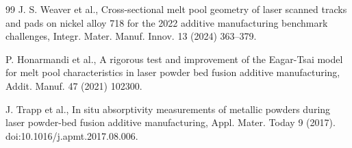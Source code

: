 \documentclass[preprint,times]{elsarticle}
\begin{document}
\begin{thebibliography}{99}
J. S. Weaver et al., Cross-sectional melt pool geometry of laser scanned tracks and pads on nickel
alloy 718 for the 2022 additive manufacturing benchmark challenges, Integr. Mater. Manuf. Innov. 13 (2024) 363--379.

P. Honarmandi et al., A rigorous test and improvement of the
Eagar-Tsai model for melt pool characteristics in laser powder bed fusion
additive manufacturing, Addit. Manuf. 47 (2021) 102300.

J. Trapp et al., In situ absorptivity
measurements of metallic powders during laser powder-bed fusion additive
manufacturing, Appl. Mater. Today 9 (2017).
doi:10.1016/j.apmt.2017.08.006.

\end{thebibliography}
\end{document}
